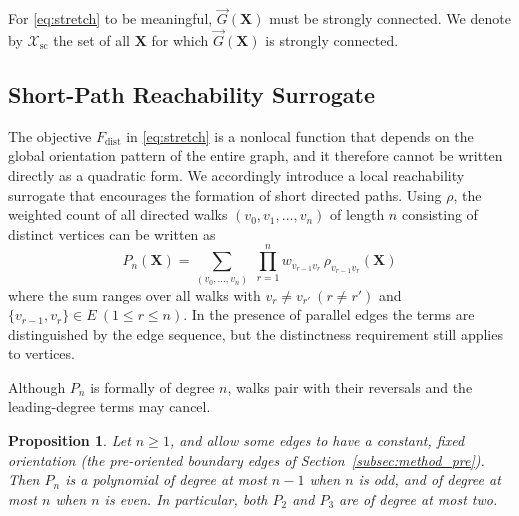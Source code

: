 \documentclass[twocolumn,a4paper]{article}
\newtheorem{proposition}[theorem]{Proposition}
\begin{document}
For \eqref{eq:stretch} to be meaningful, \(\vec{G}(\mathbf{X})\) must be strongly connected. We denote by \(\mathcal{X}_{\mathrm{sc}}\) the set of all \(\mathbf{X}\) for which \(\vec{G}(\mathbf{X})\) is strongly connected.

\subsection{Short-Path Reachability Surrogate} \label{subsec:model_hop}

The objective \(F_{\mathrm{dist}}\) in \eqref{eq:stretch} is a nonlocal function that depends on the global orientation pattern of the entire graph, and it therefore cannot be written directly as a quadratic form. We accordingly introduce a local reachability surrogate that encourages the formation of short directed paths. Using \(\rho\), the weighted count of all directed walks \((v_0,v_1,\dots,v_n)\) of length \(n\) consisting of distinct vertices can be written as
\begin{equation}
P_n(\mathbf{X})=\sum_{(v_0,\dots,v_n)}\;\prod_{r=1}^{n}w_{v_{r-1}v_r}\,\rho_{v_{r-1}v_r}(\mathbf{X})
\label{eq:pn}
\end{equation}
where the sum ranges over all walks with \(v_r\neq v_{r'}\ (r\neq r')\) and \(\{v_{r-1},v_r\}\in E\ (1\leq r\leq n)\). In the presence of parallel edges the terms are distinguished by the edge sequence, but the distinctness requirement still applies to vertices.

Although \(P_n\) is formally of degree \(n\), walks pair with their reversals and the leading-degree terms may cancel.

\begin{proposition} \label{prop:deg}
Let \(n\geq1\), and allow some edges to have a constant, fixed orientation (the pre-oriented boundary edges of Section~\ref{subsec:method_pre}). Then \(P_n\) is a polynomial of degree at most \(n-1\) when \(n\) is odd, and of degree at most \(n\) when \(n\) is even. In particular, both \(P_2\) and \(P_3\) are of degree at most two.
\end{proposition}
\end{document}
